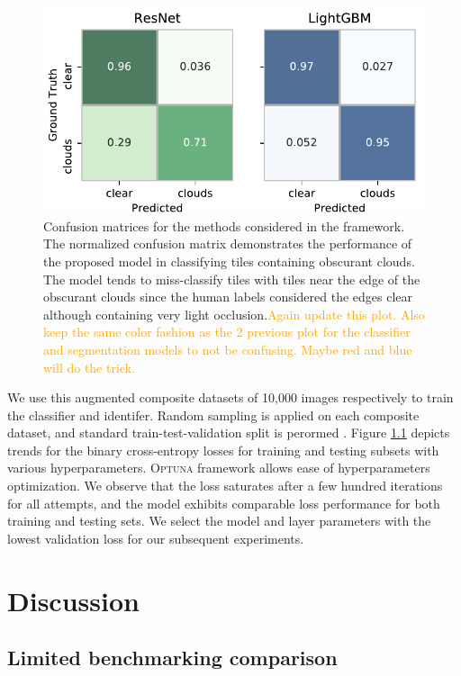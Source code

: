 \documentclass[amt, article]{copernicus}
\begin{document}
\begin{figure}[t]
	\includegraphics[width=\hsize]{figures/confusion_matrices.png}
	\caption{ Confusion matrices for the methods considered in the framework. The normalized confusion matrix demonstrates the performance of the proposed model in classifying tiles containing obscurant clouds. The model tends to miss-classify tiles with tiles near the edge of the obscurant clouds since the human labels considered the edges clear although containing very light occlusion.\textcolor{orange}{Again update this plot. Also keep the same color fashion as the 2 previous plot for the classifier and segmentation models to not be confusing. Maybe red and blue will do the trick.}}
    \label{fig:confusion_matrices}
\end{figure}

We use this augmented composite datasets of 10,000 images respectively to train the classifier and identifer. Random sampling is applied on each composite dataset, and standard train-test-validation split is perormed . Figure \ref{} depicts trends for the binary cross-entropy losses for training and testing subsets with various hyperparameters. \textsc{Optuna} framework allows ease of hyperparameters optimization. We observe that the loss saturates after a few hundred iterations for all attempts, and the model exhibits comparable loss performance for both training and testing sets. We select the model and layer parameters with the lowest validation loss for our subsequent experiments.



\section{Discussion}
\label{sec:discussion}

\subsection{Limited benchmarking comparison}
\end{document}
